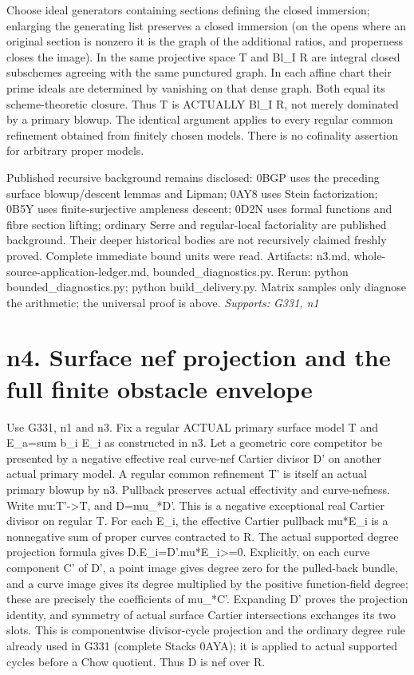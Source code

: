 \documentclass[11pt]{article}
\begin{document}
Choose ideal generators containing sections defining the closed immersion; enlarging the generating list preserves a closed immersion (on the opens where an original section is nonzero it is the graph of the additional ratios, and properness closes the image). In the same projective space T and Bl\_I R are integral closed subschemes agreeing with the same punctured graph. In each affine chart their prime ideals are determined by vanishing on that dense graph. Both equal its scheme-theoretic closure. Thus T is ACTUALLY Bl\_I R, not merely dominated by a primary blowup. The identical argument applies to every regular common refinement obtained from finitely chosen models. There is no cofinality assertion for arbitrary proper models.

Published recursive background remains disclosed: 0BGP uses the preceding surface blowup/descent lemmas and Lipman; 0AY8 uses Stein factorization; 0B5Y uses finite-surjective ampleness descent; 0D2N uses formal functions and fibre section lifting; ordinary Serre and regular-local factoriality are published background. Their deeper historical bodies are not recursively claimed freshly proved. Complete immediate bound units were read. Artifacts: n3.md, whole-source-application-ledger.md, bounded\_diagnostics.py. Rerun: python bounded\_diagnostics.py; python build\_delivery.py. Matrix samples only diagnose the arithmetic; the universal proof is above.
\textit{Supports: G331, n1}

\section{n4. Surface nef projection and the full finite obstacle envelope}

Use G331, n1 and n3. Fix a regular ACTUAL primary surface model T and E\_a=sum b\_i E\_i as constructed in n3. Let a geometric core competitor be presented by a negative effective real curve-nef Cartier divisor D' on another actual primary model. A regular common refinement T' is itself an actual primary blowup by n3. Pullback preserves actual effectivity and curve-nefness. Write mu:T'->T, and D=mu\_*D'. This is a negative exceptional real Cartier divisor on regular T. For each E\_i, the effective Cartier pullback mu*E\_i is a nonnegative sum of proper curves contracted to R. The actual supported degree projection formula gives D.E\_i=D'.mu*E\_i>=0. Explicitly, on each curve component C' of D', a point image gives degree zero for the pulled-back bundle, and a curve image gives its degree multiplied by the positive function-field degree; these are precisely the coefficients of mu\_*C'. Expanding D' proves the projection identity, and symmetry of actual surface Cartier intersections exchanges its two slots. This is componentwise divisor-cycle projection and the ordinary degree rule already used in G331 (complete Stacks 0AYA); it is applied to actual supported cycles before a Chow quotient. Thus D is nef over R.
\end{document}

